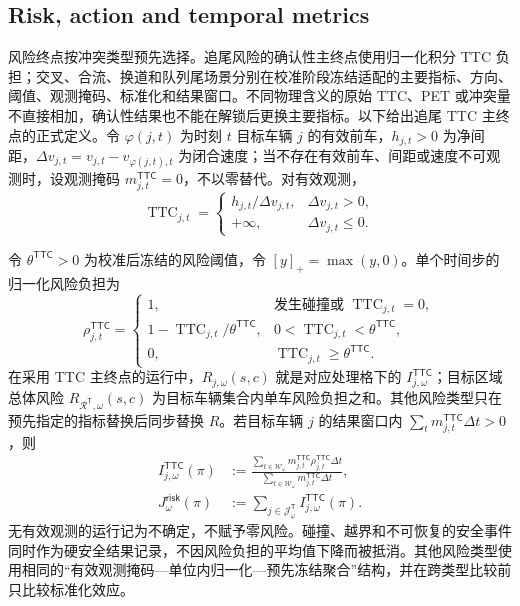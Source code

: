 \documentclass[10pt,a4paper,twocolumn]{article}
\begin{document}
\subsection*{Risk, action and temporal metrics}
风险终点按冲突类型预先选择。追尾风险的确认性主终点使用归一化积分 TTC 负担；交叉、合流、换道和队列尾场景分别在校准阶段冻结适配的主要指标、方向、阈值、观测掩码、标准化和结果窗口。不同物理含义的原始 TTC、PET 或冲突量不直接相加，确认性结果也不能在解锁后更换主要指标。以下给出追尾 TTC 主终点的正式定义。令 $\varphi(j,t)$ 为时刻 $t$ 目标车辆 $j$ 的有效前车，$h_{j,t}>0$ 为净间距，$\Delta v_{j,t}=v_{j,t}-v_{\varphi(j,t),t}$ 为闭合速度；当不存在有效前车、间距或速度不可观测时，设观测掩码 $m_{j,t}^{\mathsf{TTC}}=0$，不以零替代。对有效观测，
\begin{equation*}
\operatorname{TTC}_{j,t}=
\begin{cases}
h_{j,t}/\Delta v_{j,t},&\Delta v_{j,t}>0,\\
+\infty,&\Delta v_{j,t}\leq 0.
\end{cases}
\end{equation*}

令 $\theta^{\mathsf{TTC}}>0$ 为校准后冻结的风险阈值，令 $[y]_+=\max(y,0)$。单个时间步的归一化风险负担为
\begin{equation*}
\rho_{j,t}^{\mathsf{TTC}}=
\begin{cases}
1,&\text{发生碰撞或 }\operatorname{TTC}_{j,t}=0,\\
1-\operatorname{TTC}_{j,t}/\theta^{\mathsf{TTC}},
&0<\operatorname{TTC}_{j,t}<\theta^{\mathsf{TTC}},\\
0,&\operatorname{TTC}_{j,t}\geq\theta^{\mathsf{TTC}}.
\end{cases}
\end{equation*}
在采用 TTC 主终点的运行中，$R_{j,\omega}(s,c)$ 就是对应处理格下的 $I_{j,\omega}^{\mathsf{TTC}}$；目标区域总体风险 $R_{\mathcal R^{\mathsf T},\omega}(s,c)$ 为目标车辆集合内单车风险负担之和。其他风险类型只在预先指定的指标替换后同步替换 $R$。若目标车辆 $j$ 的结果窗口内 $\sum_t m_{j,t}^{\mathsf{TTC}}\Delta t>0$，则
\begin{equation*}
\begin{aligned}
I_{j,\omega}^{\mathsf{TTC}}(\pi)
&:=\frac{\sum_{t\in\mathcal W_\omega}m_{j,t}^{\mathsf{TTC}}
\rho_{j,t}^{\mathsf{TTC}}\Delta t}
{\sum_{t\in\mathcal W_\omega}m_{j,t}^{\mathsf{TTC}}\Delta t},\\
J_{\omega}^{\mathsf{risk}}(\pi)
&:=\sum_{j\in\mathcal J^{\mathsf T}_{\omega}}I_{j,\omega}^{\mathsf{TTC}}(\pi).
\end{aligned}
\end{equation*}
无有效观测的运行记为不确定，不赋予零风险。碰撞、越界和不可恢复的安全事件同时作为硬安全结果记录，不因风险负担的平均值下降而被抵消。其他风险类型使用相同的“有效观测掩码—单位内归一化—预先冻结聚合”结构，并在跨类型比较前只比较标准化效应。
\end{document}
